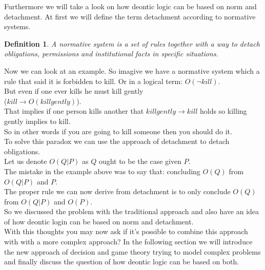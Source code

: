 \documentclass[conference]{IEEE}
\newtheorem{definition}{Definition}
\begin{document}
Furthermore we will take a look on how deontic logic can be based on norm and detachment. At first we will define the term detachment according to normative systems.\\
\begin{definition}
A normative system is a set of rules together with
a way to detach obligations, permissions and institutional facts in specific situations. \cite{b2}
\end{definition}

Now we can look at an example. So imagive we have a normative system which a rule that said it is forbidden to kill. Or in a logical term: $O(\lnot kill)$.\\
But even if one ever kills he must kill gently\\
($kill \to O(killgently)$).\\
That implies if one person kills another that $killgently \to kill$ holds so killing gently implies to kill.\\
So in other words if you are going to kill someone then you should do it.\\
To solve this paradox we can use the approach of detachment to detach obligations.\\
Let us denote $O(Q | P)$ as $Q$ ought to be the case given $P$.\\
The mistake in the example above was to say that: concluding $O(Q)$ from $O(Q | P)$ and $P$.\\
The proper rule we can now derive from detachment is to only conclude $O(Q)$ from $O(Q | P)$ and $O(P)$.\\

So we discussed the problem with the traditional approach and also have an idea of how deontic login can be based on norm and detachment.\\
With this thoughts you may now ask if it's possible to combine this approach with with a more complex approach? In the following section we will introduce the new approach of decision and game theory trying to model complex problems and finally discuss the question of how deontic logic can be based on both.
\end{document}
